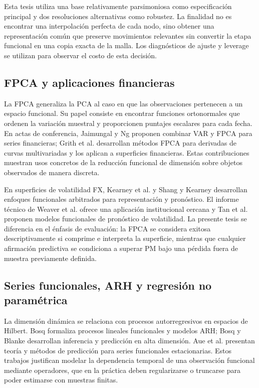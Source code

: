 \documentclass[a4paper,11pt]{article}
\begin{document}
Esta tesis utiliza una base relativamente parsimoniosa como especificación principal y dos resoluciones alternativas como robustez. La finalidad no es encontrar una interpolación perfecta de cada nodo, sino obtener una representación común que preserve movimientos relevantes sin convertir la etapa funcional en una copia exacta de la malla. Los diagnósticos de ajuste y leverage se utilizan para observar el costo de esta decisión.

\subsection{FPCA y aplicaciones financieras}

La FPCA generaliza la PCA al caso en que las observaciones pertenecen a un espacio funcional. Su papel consiste en encontrar funciones ortonormales que ordenen la variación muestral y proporcionen puntajes escalares para cada fecha. En actas de conferencia, Jaimungal y Ng \cite{JaimungalNg2007} proponen combinar VAR y FPCA para series financieras; Grith et al. \cite{Grith2018} desarrollan métodos FPCA para derivadas de curvas multivariadas y los aplican a superficies financieras. Estas contribuciones muestran usos concretos de la reducción funcional de dimensión sobre objetos observados de manera discreta.

En superficies de volatilidad FX, Kearney et al. \cite{Kearney2018} y Shang y Kearney \cite{ShangKearney2022} desarrollan enfoques funcionales arbitrados para representación y pronóstico. El informe técnico de Weaver et al. \cite{Weaver2020} ofrece una aplicación institucional cercana y Tan et al. \cite{Tan2024} proponen modelos funcionales de pronóstico de volatilidad. La presente tesis se diferencia en el énfasis de evaluación: la FPCA se considera exitosa descriptivamente si comprime e interpreta la superficie, mientras que cualquier afirmación predictiva se condiciona a superar PM bajo una pérdida fuera de muestra previamente definida.

\subsection{Series funcionales, ARH y regresión no paramétrica}

La dimensión dinámica se relaciona con procesos autorregresivos en espacios de Hilbert. Bosq \cite{Bosq2000} formaliza procesos lineales funcionales y modelos ARH; Bosq y Blanke \cite{BosqBlanke2007} desarrollan inferencia y predicción en alta dimensión. Aue et al. \cite{Aue2015} presentan teoría y métodos de predicción para series funcionales estacionarias. Estos trabajos justifican modelar la dependencia temporal de una observación funcional mediante operadores, que en la práctica deben regularizarse o truncarse para poder estimarse con muestras finitas.
\end{document}
